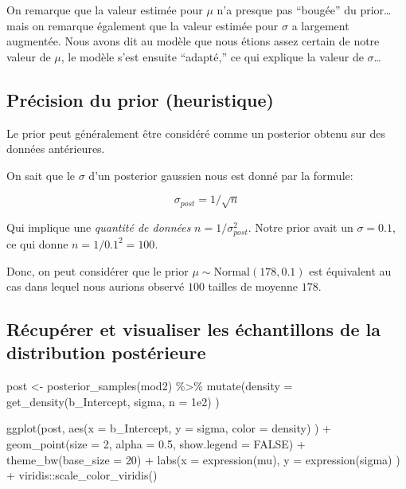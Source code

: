 \documentclass[
  a4paper,11pt,twoside,onecolumn,openright,final,oldfontcommands]{memoir}
\newenvironment{Shaded}{\begin{snugshade}}{\end{snugshade}}
\newcommand{\AttributeTok}[1]{\textcolor[rgb]{0.77,0.63,0.00}{#1}}
\newcommand{\ConstantTok}[1]{\textcolor[rgb]{0.00,0.00,0.00}{#1}}
\newcommand{\DecValTok}[1]{\textcolor[rgb]{0.00,0.00,0.81}{#1}}
\newcommand{\FloatTok}[1]{\textcolor[rgb]{0.00,0.00,0.81}{#1}}
\newcommand{\FunctionTok}[1]{\textcolor[rgb]{0.00,0.00,0.00}{#1}}
\newcommand{\NormalTok}[1]{#1}
\newcommand{\OtherTok}[1]{\textcolor[rgb]{0.56,0.35,0.01}{#1}}
\newcommand{\SpecialCharTok}[1]{\textcolor[rgb]{0.00,0.00,0.00}{#1}}
\theoremstyle{definition}
\theoremstyle{definition}
\theoremstyle{definition}
\theoremstyle{remark}
\begin{document}
On remarque que la valeur estimée pour \(\mu\) n'a presque pas ``bougée'' du prior\ldots mais on remarque également que la valeur estimée pour \(\sigma\) a largement augmentée. Nous avons dit au modèle que nous étions assez certain de notre valeur de \(\mu\), le modèle s'est ensuite ``adapté,'' ce qui explique la valeur de \(\sigma\)\ldots{}

\hypertarget{pruxe9cision-du-prior-heuristique}{%
\subsection{Précision du prior (heuristique)}\label{pruxe9cision-du-prior-heuristique}}

Le prior peut généralement être considéré comme un posterior obtenu sur des données antérieures.

On sait que le \(\sigma\) d'un posterior gaussien nous est donné par la formule:

\[\sigma_{post} = 1 / \sqrt{n}\]

Qui implique une \emph{quantité de données} \(n = 1 / \sigma^2_{post}\). Notre prior avait un \(\sigma = 0.1\), ce qui donne \(n = 1 / 0.1^2 = 100\).

Donc, on peut considérer que le prior \(\mu \sim \mathrm{Normal}(178, 0.1)\) est équivalent au cas dans lequel nous aurions observé \(100\) tailles de moyenne \(178\).

\hypertarget{ruxe9cupuxe9rer-et-visualiser-les-uxe9chantillons-de-la-distribution-postuxe9rieure}{%
\subsection{Récupérer et visualiser les échantillons de la distribution postérieure}\label{ruxe9cupuxe9rer-et-visualiser-les-uxe9chantillons-de-la-distribution-postuxe9rieure}}

\begin{Shaded}
\begin{Highlighting}[]
\NormalTok{post }\OtherTok{\textless{}{-}} \FunctionTok{posterior\_samples}\NormalTok{(mod2) }\SpecialCharTok{\%\textgreater{}\%}
    \FunctionTok{mutate}\NormalTok{(}\AttributeTok{density =} \FunctionTok{get\_density}\NormalTok{(b\_Intercept, sigma, }\AttributeTok{n =} \FloatTok{1e2}\NormalTok{) )}

\FunctionTok{ggplot}\NormalTok{(post, }\FunctionTok{aes}\NormalTok{(}\AttributeTok{x =}\NormalTok{ b\_Intercept, }\AttributeTok{y =}\NormalTok{ sigma, }\AttributeTok{color =}\NormalTok{ density) ) }\SpecialCharTok{+}
    \FunctionTok{geom\_point}\NormalTok{(}\AttributeTok{size =} \DecValTok{2}\NormalTok{, }\AttributeTok{alpha =} \FloatTok{0.5}\NormalTok{, }\AttributeTok{show.legend =} \ConstantTok{FALSE}\NormalTok{) }\SpecialCharTok{+}
    \FunctionTok{theme\_bw}\NormalTok{(}\AttributeTok{base\_size =} \DecValTok{20}\NormalTok{) }\SpecialCharTok{+}
    \FunctionTok{labs}\NormalTok{(}\AttributeTok{x =} \FunctionTok{expression}\NormalTok{(mu), }\AttributeTok{y =} \FunctionTok{expression}\NormalTok{(sigma) ) }\SpecialCharTok{+}
\NormalTok{    viridis}\SpecialCharTok{::}\FunctionTok{scale\_color\_viridis}\NormalTok{()}
\end{Highlighting}
\end{Shaded}
\end{document}
